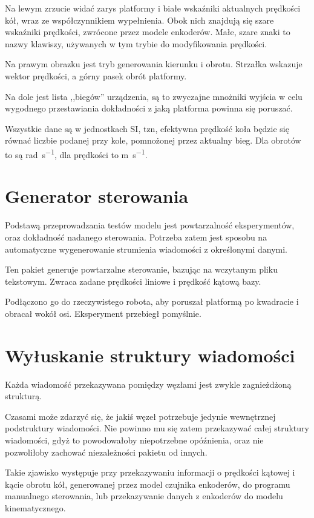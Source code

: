 	Na lewym zrzucie widać zarys platformy i białe wskaźniki aktualnych prędkości kół, wraz ze współczynnikiem wypełnienia.
	Obok nich znajdują się szare wskaźniki prędkości, zwrócone przez modele enkoderów.
	Małe, szare znaki to nazwy klawiszy, używanych w tym trybie do modyfikowania prędkości.
	
	Na prawym obrazku jest tryb generowania kierunku i obrotu. Strzałka wskazuje wektor prędkości, a górny pasek obrót platformy.
	
	Na dole jest lista ,,biegów'' urządzenia, są to zwyczajne mnożniki wyjścia w celu wygodnego przestawiania dokładności z jaką platforma powinna się poruszać.
	
	Wszystkie dane są w jednostkach SI, tzn, efektywna prędkość koła będzie się równać liczbie podanej przy kole, pomnożonej przez aktualny bieg.
	Dla obrotów to są \si{\radian\per\second}, dla prędkości to \si{\metre\per\second}.
	
\section{Generator sterowania}
	\label{sec:gramofon}
	Podstawą przeprowadzania testów modelu jest powtarzalność eksperymentów, oraz dokładność nadanego sterowania.
	Potrzeba zatem jest sposobu na automatyczne wygenerowanie strumienia wiadomości z określonymi danymi.
	
	Ten pakiet generuje powtarzalne sterowanie, bazując na wczytanym pliku tekstowym.
	Zwraca zadane prędkości liniowe i prędkość kątową bazy.
	
	Podłączono go do rzeczywistego robota, aby poruszał platformą po kwadracie i obracał wokół osi.
	Eksperyment przebiegł pomyślnie.
		
\section{Wyłuskanie struktury wiadomości}
	\label{sec:dziadzio}
	Każda wiadomość przekazywana pomiędzy węzłami jest zwykle zagnieżdżoną strukturą.
	
	Czasami może zdarzyć się, że jakiś węzeł potrzebuje jedynie wewnętrznej podstruktury wiadomości.
	Nie powinno mu się zatem przekazywać całej struktury wiadomości, gdyż to powodowałoby niepotrzebne opóźnienia, oraz nie pozwoliłoby zachować niezależności 
	pakietu od innych.
	
	Takie zjawisko występuje przy przekazywaniu informacji o prędkości kątowej i kącie obrotu kół, generowanej przez model czujnika enkoderów, do programu
	manualnego sterowania, lub przekazywanie danych z enkoderów do modelu kinematycznego.
	
